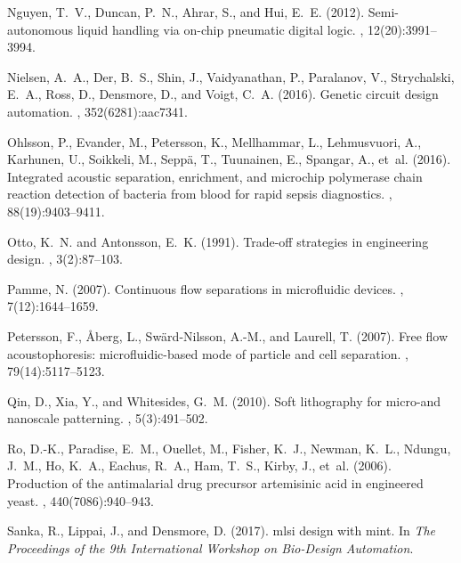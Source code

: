 \documentclass[12pt,letterpaper]{report}          %
\begin{document}
\begin{thebibliography}{}
Nguyen, T.~V., Duncan, P.~N., Ahrar, S., and Hui, E.~E. (2012).
\newblock Semi-autonomous liquid handling via on-chip pneumatic digital logic.
, 12(20):3991--3994.

Nielsen, A.~A., Der, B.~S., Shin, J., Vaidyanathan, P., Paralanov, V.,
  Strychalski, E.~A., Ross, D., Densmore, D., and Voigt, C.~A. (2016).
\newblock Genetic circuit design automation.
, 352(6281):aac7341.

Ohlsson, P., Evander, M., Petersson, K., Mellhammar, L., Lehmusvuori, A.,
  Karhunen, U., Soikkeli, M., Seppä, T., Tuunainen, E., Spangar, A., et~al.
  (2016).
\newblock Integrated acoustic separation, enrichment, and microchip polymerase
  chain reaction detection of bacteria from blood for rapid sepsis diagnostics.
, 88(19):9403--9411.

Otto, K.~N. and Antonsson, E.~K. (1991).
\newblock Trade-off strategies in engineering design.
, 3(2):87--103.

Pamme, N. (2007).
\newblock Continuous flow separations in microfluidic devices.
, 7(12):1644--1659.

Petersson, F., {\AA}berg, L., Sw{\"a}rd-Nilsson, A.-M., and Laurell, T. (2007).
\newblock Free flow acoustophoresis: microfluidic-based mode of particle and
  cell separation.
, 79(14):5117--5123.

Qin, D., Xia, Y., and Whitesides, G.~M. (2010).
\newblock Soft lithography for micro-and nanoscale patterning.
, 5(3):491--502.

Ro, D.-K., Paradise, E.~M., Ouellet, M., Fisher, K.~J., Newman, K.~L., Ndungu,
  J.~M., Ho, K.~A., Eachus, R.~A., Ham, T.~S., Kirby, J., et~al. (2006).
\newblock Production of the antimalarial drug precursor artemisinic acid in
  engineered yeast.
, 440(7086):940--943.

Sanka, R., Lippai, J., and Densmore, D. (2017).
\newblock mlsi design with mint.
\newblock In {\em The Proceedings of the 9th International Workshop on
  Bio-Design Automation}.


\end{thebibliography}
\end{document}

